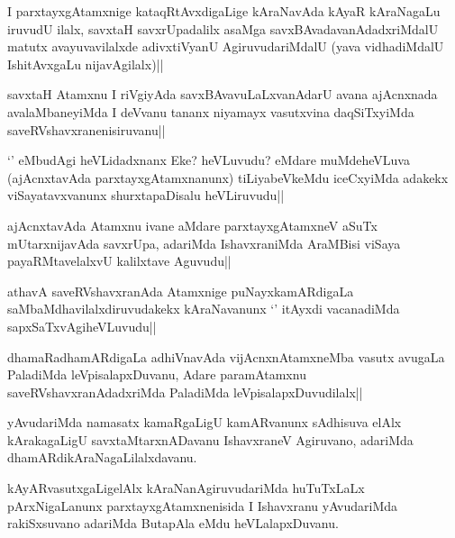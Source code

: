
\begin{artha}
I parxtayxgAtamxnige kataqRtAvxdigaLige kAraNavAda kAyaR kAraNagaLu iruvudU ilalx, savxtaH savxrUpadalilx asaMga savxBAvadavanAdadxriMdalU matutx avayuvavilalxde adivxtiVyanU AgiruvudariMdalU (yava vidhadiMdalU IshitAvxgaLu nijavAgilalx)||
\end{artha}

\begin{artha}
savxtaH Atamxnu I riVgiyAda savxBAvavuLaLxvanAdarU avana ajAcnxnada avalaMbaneyiMda I deVvanu tananx niyamayx vasutxvina daqSiTxyiMda saveRVshavxranenisiruvanu||
\end{artha}


\begin{artha}
`\stext' eMbudAgi heVLidadxnanx Eke? heVLuvudu? eMdare muMdeheVLuva (ajAcnxtavAda parxtayxgAtamxnanunx) tiLiyabeVkeMdu iceCxyiMda adakekx viSayatavxvanunx shurxtapaDisalu heVLiruvudu||
\end{artha}

\begin{artha}
ajAcnxtavAda Atamxnu ivane aMdare parxtayxgAtamxneV aSuTx mUtarxnijavAda savxrUpa, adariMda IshavxraniMda AraMBisi viSaya payaRMtavelalxvU kalilxtave Aguvudu||
\end{artha}

\begin{artha}
athavA saveRVshavxranAda Atamxnige puNayxkamARdigaLa saMbaMdhavilalxdiruvudakekx kAraNavanunx `\stext' itAyxdi vacanadiMda sapxSaTxvAgiheVLuvudu||
\end{artha}


\begin{artha}
dhamaRadhamARdigaLa adhiVnavAda vijAcnxnAtamxneMba vasutx avugaLa PaladiMda leVpisalapxDuvanu, Adare paramAtamxnu saveRVshavxranAdadxriMda PaladiMda leVpisalapxDuvudilalx||
\end{artha}

\begin{artha}
yAvudariMda namasatx kamaRgaLigU kamARvanunx sAdhisuva elAlx kArakagaLigU savxtaMtarxnADavanu IshavxraneV Agiruvano, adariMda dhamARdikAraNagaLilalxdavanu.
\end{artha}

\begin{artha}
kAyARvasutxgaLigelAlx kAraNanAgiruvudariMda huTuTxLaLx pArxNigaLanunx parxtayxgAtamxnenisida I Ishavxranu yAvudariMda rakiSxsuvano adariMda ButapAla eMdu heVLalapxDuvanu.
\end{artha}

